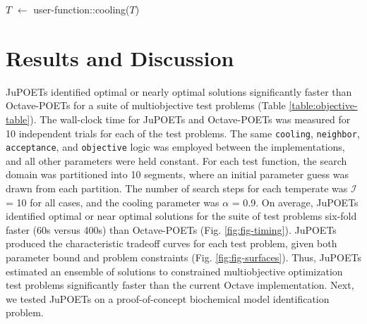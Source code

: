 \documentclass{bmcart}
\begin{document}
\begin{algorithm}[h!]
{    \BlankLine
    $T$ $\leftarrow$ user-function::cooling($T$)\;
 }
\vspace{0.05in}
\caption{Pseudo-code for the main run-loop of JuPOETs.
The user specifies the \texttt{neighbor}, \texttt{acceptance}, \texttt{cooling} and \texttt{objective} functions along with an initial parameter guess.
The rank archive $\mathcal{R}$, solution archive $\mathcal{S}$ and objective archive $\mathcal{O}$ are initialized from the initial guess.
The initial guess is perturbed in the \texttt{neighbor} function, which generates a new solution whose performance is evaluated using the user supplied \texttt{objective} function.
The new solution and objective values are then added to the respective archives and ranked using the builtin \texttt{rank} function.
If the new solution is accepted (based upon a probability calculated with the user supplied \texttt{acceptance} function) it is added to the solution and objective archive.
This solution is then perturbed during the next iteration of the algorithm. However, if the solution is not accepted, it is removed from the archive and discarded. The computational temperature is adjusted using the user supplied \texttt{cooling} function after each $\mathcal{I}$ iterations. }\label{algo:JuPOETs-pcode}
\end{algorithm}



\clearpage

\section*{Results and Discussion}

JuPOETs identified optimal or nearly optimal solutions significantly faster than Octave-POETs for a suite of multiobjective test problems (Table \ref{table:objective-table}).
The wall-clock time for JuPOETs and Octave-POETs was measured for 10 independent trials for each of the test problems.
The same \texttt{cooling}, \texttt{neighbor}, \texttt{acceptance}, and \texttt{objective} logic was employed between the implementations, and all other parameters were held constant.
For each test function, the search domain was partitioned into 10 segments, where an initial parameter guess was drawn from each partition.
The number of search steps for each temperate was $\mathcal{I}$ = 10 for all cases, and the cooling parameter was $\alpha$ = 0.9.
On average, JuPOETs identified optimal or near optimal solutions for the suite of test problems six-fold faster (60s versus 400s)
than Octave-POETs (Fig. \ref{fig:fig-timing}). JuPOETs produced the characteristic tradeoff curves for each test problem, given both parameter bound and
problem constraints (Fig. \ref{fig:fig-surfaces}).
Thus, JuPOETs estimated an ensemble of solutions to constrained multiobjective optimization test problems significantly faster than the current Octave implementation.
Next, we tested JuPOETs on a proof-of-concept biochemical model identification problem.
\end{document}
